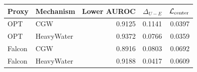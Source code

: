 \begin{tabular}{@{}llrrr@{}}
\toprule
Proxy & Mechanism & Lower AUROC & $\Delta_{U-E}$ & $\mathcal L_{\rm center}$ \\
\midrule
OPT & CGW & 0.9125 & 0.1141 & 0.0397 \\
OPT & HeavyWater & 0.9372 & 0.0766 & 0.0359 \\
Falcon & CGW & 0.8916 & 0.0803 & 0.0692 \\
Falcon & HeavyWater & 0.9188 & 0.0417 & 0.0609 \\
\bottomrule
\end{tabular}
